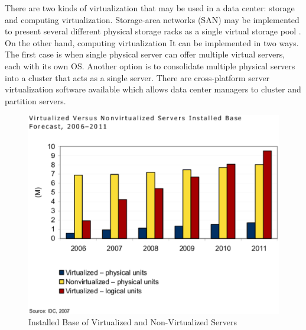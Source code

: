                 There are two kinds of virtualization that may be used in a data center: storage and computing virtualization. Storage-area networks (SAN) may be implemented to present several different physical storage racks as a single virtual storage pool \cite{Antonopoulos05}. On the other hand, computing virtualization It can be implemented in two ways. The first case is when single physical server can offer multiple virtual servers, each with its own OS. Another option is to consolidate multiple physical servers into a cluster that acts as a single server. There are cross-platform server virtualization software available which allows data center managers to cluster and partition servers.
                \begin{figure}[h!tb]
                    \centering
                    \includegraphics{graphics/installed_base_virtualized_servers}
                    \caption{Installed Base of Virtualized and Non-Virtualized Servers}
                    \label{fig:installed_base_virtualized_servers}
                \end{figure}
                
